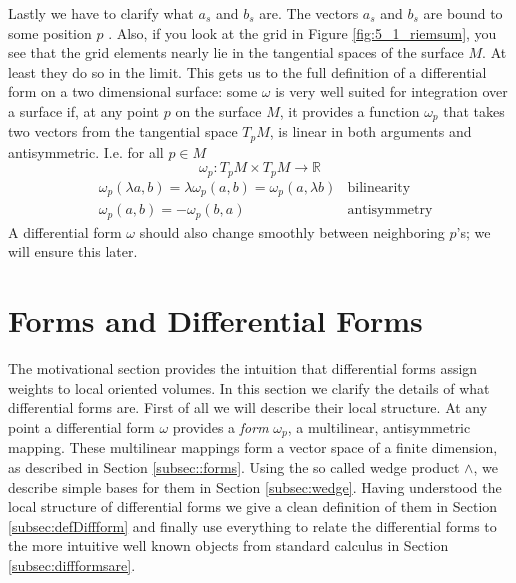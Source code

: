Lastly we have to clarify what $a_s$ and $b_s$ are. The vectors $a_s$ and $b_s$ are bound to some position $p$ . Also, if you look at the grid in Figure \ref{fig:5_1_riemsum}, you see that the grid elements nearly lie in the tangential spaces of the surface $M$. At least they do so in the limit. This gets us to the full definition of a differential form on a two dimensional surface: some $\omega$ is very well suited for integration over a surface if, at any point $p$ on the surface $M$, it provides a function $\omega_p$ that takes two vectors from the tangential space $T_pM$, is linear in both arguments and antisymmetric. I.e. for all $p \in M$
\[\omega_p: T_p M \times T_p M \to \mathbb R\]
\begin{align*}&\omega_p(\lambda a,b) = \lambda \omega_p(a,b) = \omega_p(a,\lambda b) &\text{bilinearity} \\
&\omega_p(a,b) = -\omega_p(b,a)  &\text{antisymmetry}\end{align*}
A differential form $\omega$ should also  change smoothly between neighboring $p$'s; we will ensure this later.


\section{Forms and Differential Forms}
The motivational section provides the intuition that differential forms assign weights to local oriented volumes. In this section we clarify the details of what differential forms are. First of all we will describe their local structure. At any point a differential form $\omega$ provides a \emph{form} $\omega_p$, a multilinear, antisymmetric mapping. These multilinear mappings form a vector space of a finite dimension, as described in Section \ref{subsec::forms}. Using the so called wedge product $\wedge$, we describe simple bases for them in Section \ref{subsec:wedge}. Having understood the local structure of differential forms we give a clean definition of them in Section \ref{subsec:defDiffform} and finally use everything to relate the differential forms to the more intuitive well known objects from standard calculus in Section \ref{subsec:diffformsare}.

